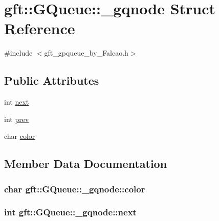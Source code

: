 \hypertarget{structgft_1_1GQueue_1_1__gqnode}{}\section{gft\+:\+:G\+Queue\+:\+:\+\_\+gqnode Struct Reference}
\label{structgft_1_1GQueue_1_1__gqnode}


{\ttfamily \#include $<$gft\+\_\+gpqueue\+\_\+by\+\_\+\+Falcao.\+h$>$}

\subsection*{Public Attributes}
\begin{DoxyCompactItemize}
\item 
int \hyperlink{structgft_1_1GQueue_1_1__gqnode_af76b46451ec6934dbb4a9d04070e86ce}{next}
\item 
int \hyperlink{structgft_1_1GQueue_1_1__gqnode_ab9f8ff22b56ce8c4b8aeedec3d87046b}{prev}
\item 
char \hyperlink{structgft_1_1GQueue_1_1__gqnode_aec38d39d460c53a928750aa6e1cb1fa8}{color}
\end{DoxyCompactItemize}


\subsection{Member Data Documentation}
\subsubsection[{\texorpdfstring{color}{color}}]{\setlength{\rightskip}{0pt plus 5cm}char gft\+::\+G\+Queue\+::\+\_\+gqnode\+::color}\hypertarget{structgft_1_1GQueue_1_1__gqnode_aec38d39d460c53a928750aa6e1cb1fa8}{}\label{structgft_1_1GQueue_1_1__gqnode_aec38d39d460c53a928750aa6e1cb1fa8}
\subsubsection[{\texorpdfstring{next}{next}}]{\setlength{\rightskip}{0pt plus 5cm}int gft\+::\+G\+Queue\+::\+\_\+gqnode\+::next}\hypertarget{structgft_1_1GQueue_1_1__gqnode_af76b46451ec6934dbb4a9d04070e86ce}{}\label{structgft_1_1GQueue_1_1__gqnode_af76b46451ec6934dbb4a9d04070e86ce}
